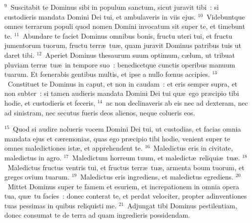 ${}^{9}$~Suscitabit te Dominus sibi in populum sanctum, sicut juravit tibi~: si custodieris mandata Domini Dei tui, et ambulaveris in viis ejus.
${}^{10}$~Videbuntque omnes terrarum populi quod nomen Domini invocatum sit super te, et timebunt te.
${}^{11}$~Abundare te faciet Dominus omnibus bonis, fructu uteri tui, et fructu jumentorum tuorum, fructu terr\ae\ tu\ae , quam juravit Dominus patribus tuis ut daret tibi.
${}^{12}$~Aperiet Dominus thesaurum suum optimum, c\ae lum, ut tribuat pluviam terr\ae\ tu\ae\ in tempore suo~: benedicetque cunctis operibus manuum tuarum. Et fœnerabis gentibus multis, et ipse a nullo fœnus accipies.
${}^{13}$~Constituet te Dominus in caput, et non in caudam~: et eris semper supra, et non subter~: si tamen audieris mandata Domini Dei tui qu\ae\ ego pr\ae cipio tibi hodie, et custodieris et feceris,
${}^{14}$~ac non declinaveris ab eis nec ad dexteram, nec ad sinistram, nec secutus fueris deos alienos, neque colueris eos.


${}^{15}$~Quod si audire nolueris vocem Domini Dei tui, ut custodias, et facias omnia mandata ejus et c\ae remonias, quas ego pr\ae cipio tibi hodie, venient super te omnes maledictiones ist\ae , et apprehendent te.
${}^{16}$~Maledictus eris in civitate, maledictus in agro.
${}^{17}$~Maledictum horreum tuum, et maledict\ae\ reliqui\ae\ tu\ae .
${}^{18}$~Maledictus fructus ventris tui, et fructus terr\ae\ tu\ae , armenta boum tuorum, et greges ovium tuarum.
${}^{19}$~Maledictus eris ingrediens, et maledictus egrediens.
${}^{20}$~Mittet Dominus super te famem et esuriem, et increpationem in omnia opera tua, qu\ae\ tu facies~: donec conterat te, et perdat velociter, propter adinventiones tuas pessimas in quibus reliquisti me.
${}^{21}$~Adjungat tibi Dominus pestilentiam, donec consumat te de terra ad quam ingredieris possidendam.



